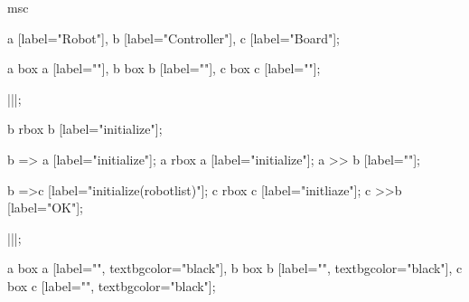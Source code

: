 \begin{msc}
msc
{

a [label="Robot"],
b [label="Controller"],
c [label="Board"];

a box a [label=""],
b box b [label=""],
c box c [label=""];

|||;

b rbox b [label="initialize"];

b => a [label="initialize"];
a rbox a [label="initialize"];
a >> b [label=""];

b =>c [label="initialize(robotlist)"];
c rbox c [label="initliaze"];
c >>b [label="OK"];

|||;

a box a [label="", textbgcolor="black"],
b box b [label="", textbgcolor="black"],
c box c [label="", textbgcolor="black"];

}
\end{msc} 
